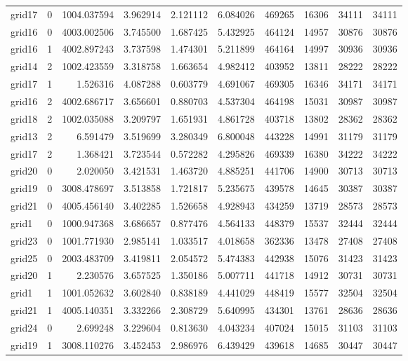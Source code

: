 \begin{longtable}{|l|r|r|r|r|r|r|r|r|r|}
grid17 & 0 & 1004.037594 & 3.962914 & 2.121112 & 6.084026 & 469265 & 16306 & 34111 & 34111 \\
grid16 & 0 & 4003.002506 & 3.745500 & 1.687425 & 5.432925 & 464124 & 14957 & 30876 & 30876 \\
grid16 & 1 & 4002.897243 & 3.737598 & 1.474301 & 5.211899 & 464164 & 14997 & 30936 & 30936 \\
grid14 & 2 & 1002.423559 & 3.318758 & 1.663654 & 4.982412 & 403952 & 13811 & 28222 & 28222 \\
grid17 & 1 & 1.526316 & 4.087288 & 0.603779 & 4.691067 & 469305 & 16346 & 34171 & 34171 \\
grid16 & 2 & 4002.686717 & 3.656601 & 0.880703 & 4.537304 & 464198 & 15031 & 30987 & 30987 \\
grid18 & 2 & 1002.035088 & 3.209797 & 1.651931 & 4.861728 & 403718 & 13802 & 28362 & 28362 \\
grid13 & 2 & 6.591479 & 3.519699 & 3.280349 & 6.800048 & 443228 & 14991 & 31179 & 31179 \\
grid17 & 2 & 1.368421 & 3.723544 & 0.572282 & 4.295826 & 469339 & 16380 & 34222 & 34222 \\
grid20 & 0 & 2.020050 & 3.421531 & 1.463720 & 4.885251 & 441706 & 14900 & 30713 & 30713 \\
grid19 & 0 & 3008.478697 & 3.513858 & 1.721817 & 5.235675 & 439578 & 14645 & 30387 & 30387 \\
grid21 & 0 & 4005.456140 & 3.402285 & 1.526658 & 4.928943 & 434259 & 13719 & 28573 & 28573 \\
grid1 & 0 & 1000.947368 & 3.686657 & 0.877476 & 4.564133 & 448379 & 15537 & 32444 & 32444 \\
grid23 & 0 & 1001.771930 & 2.985141 & 1.033517 & 4.018658 & 362336 & 13478 & 27408 & 27408 \\
grid25 & 0 & 2003.483709 & 3.419811 & 2.054572 & 5.474383 & 442938 & 15076 & 31423 & 31423 \\
grid20 & 1 & 2.230576 & 3.657525 & 1.350186 & 5.007711 & 441718 & 14912 & 30731 & 30731 \\
grid1 & 1 & 1001.052632 & 3.602840 & 0.838189 & 4.441029 & 448419 & 15577 & 32504 & 32504 \\
grid21 & 1 & 4005.140351 & 3.332266 & 2.308729 & 5.640995 & 434301 & 13761 & 28636 & 28636 \\
grid24 & 0 & 2.699248 & 3.229604 & 0.813630 & 4.043234 & 407024 & 15015 & 31103 & 31103 \\
grid19 & 1 & 3008.110276 & 3.452453 & 2.986976 & 6.439429 & 439618 & 14685 & 30447 & 30447 \\

\end{longtable}
